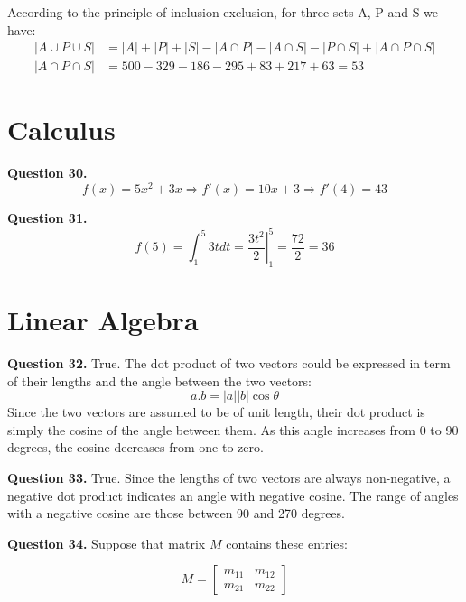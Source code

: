 \documentclass[10pt,a4paper]{article}
\newcommand{\question}[1]{\bigskip \noindent \textbf{Question #1.}}
\begin{document}
According to the principle of inclusion-exclusion, for three sets A, P and S we have:
\begin{align*}
|A \cup P \cup S| &= |A| + |P| + |S| - |A \cap P| - |A \cap S| - |P \cap S| + |A \cap P \cap S|\\
|A \cap P \cap S| &= 500 - 329 - 186 - 295 + 83 + 217 + 63 = 53
\end{align*}

\section{Calculus}

\question{30} 
\begin{equation*}
f(x) = 5x^2 + 3x \Rightarrow f'(x) = 10 x + 3 \Rightarrow f'(4) = 43
\end{equation*}

\question{31}
\begin{equation*}
f(5) = \int_1^5 3t dt = \left. \frac{3t^2}{2} \right|_1^5 = \frac{72}{2} = 36
\end{equation*}
\section{Linear Algebra}

\question{32} True. The dot product of two vectors could be expressed in term of their lengths and the angle between the two vectors:
\begin{equation*}
a . b = |a| |b| \cos \theta
\end{equation*}
Since the two vectors are assumed to be of unit length, their dot product is simply the cosine of the angle between them. As this angle increases from 0 to 90 degrees, the cosine decreases from one to zero. 

\question{33} True. Since the lengths of two vectors are always non-negative, a negative dot product indicates an angle with negative cosine. The range of angles with a negative cosine are those between 90 and 270 degrees.

\question{34} Suppose that matrix $M$ contains these entries:
\begin{center}
\begin{equation*}
M =
\begin{bmatrix}
m_{11} & m_{12} \\
m_{21} & m_{22}
\end{bmatrix}
\end{equation*}
\end{center}
\end{document}

